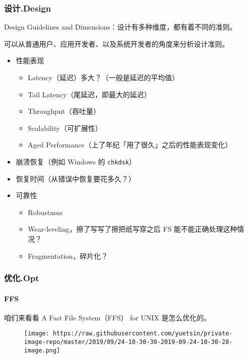 \documentclass[
]{article}
\begin{document}
\hypertarget{header-n132}{%
\subsubsection{设计.Design}\label{header-n132}}

Design Guidelines and Dimensions：设计有多种维度，都有着不同的准则。

可以从普通用户、应用开发者、以及系统开发者的角度来分析设计准则。

\begin{itemize}
\item
  性能表现

  \begin{itemize}
  \item
    Latency（延迟）多大？（一般是延迟的平均值）
  \item
    Tail Latency（尾延迟，即最大的延迟）
  \item
    Throughput（吞吐量）
  \item
    Scalability（可扩展性）
  \item
    Aged Performance（上了年纪「用了很久」之后的性能表现变化）
  \end{itemize}
\item
  崩溃恢复（例如 Windows 的 \texttt{chkdsk}）
\item
  恢复时间（从错误中恢复要花多久？）
\item
  可靠性

  \begin{itemize}
  \item
    Robustness
  \item
    Wear-leveling，擦了写写了擦把纸写穿之后 FS 能不能正确处理这种情况？
  \item
    Fragmentation，碎片化？
  \end{itemize}
\end{itemize}

\hypertarget{header-n162}{%
\subsubsection{优化.Opt}\label{header-n162}}

\hypertarget{header-n163}{%
\paragraph{FFS}\label{header-n163}}

咱们来看看 A Fast File System（FFS） for UNIX 是怎么优化的。

\begin{figure}
\centering
\texttt{[image: https://raw.githubusercontent.com/yuetsin/private-image-repo/master/2019/09/24-10-30-30-2019-09-24-10-30-28-image.png]}
\caption{}
\end{figure}
\end{document}
